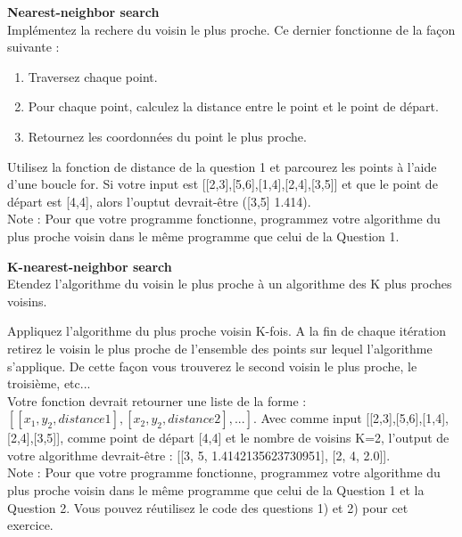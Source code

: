 \begin{Exercice}[10 minutes]\textbf{Nearest-neighbor search}\\

Implémentez la rechere du voisin le plus proche. Ce dernier fonctionne de la façon suivante :
\begin{enumerate}
    \item Traversez chaque point.
    \item Pour chaque point, calculez la distance entre le point et le point de départ.
    \item Retournez les coordonnées du point le plus proche.
\end{enumerate}
    
\begin{conseil}
    Utilisez la fonction de distance de la question 1 et parcourez les points à l'aide d'une boucle for. Si votre input est [[2,3],[5,6],[1,4],[2,4],[3,5]] et que le point de départ est [4,4], alors l'ouptut devrait-être ([3,5] 1.414).\\
    
    Note : Pour que votre programme fonctionne, programmez votre algorithme du plus proche voisin dans le même programme que celui de la Question 1.
\end{conseil}
\begin{solution}
    
\end{solution}
\end{Exercice}

\begin{Exercice}[15 minutes]\textbf{K-nearest-neighbor search}\\

Etendez l'algorithme du voisin le plus proche à un algorithme des K plus proches voisins.\\

\begin{conseil}
Appliquez l'algorithme du plus proche voisin K-fois. A la fin de chaque itération retirez le voisin le plus proche de l'ensemble des points sur lequel l'algorithme s'applique. De cette façon vous trouverez le second voisin le plus proche, le troisième, etc...\\

Votre fonction devrait retourner une liste de la forme : $[[x_1,y_2, distance1],[x_2,y_2,distance2],...]$. Avec comme input [[2,3],[5,6],[1,4],[2,4],[3,5]], comme point de départ [4,4] et le nombre de voisins K=2, l'output de votre algorithme devrait-être : [[3, 5, 1.4142135623730951], [2, 4, 2.0]].\\

Note : Pour que votre programme fonctionne, programmez votre algorithme du plus proche voisin dans le même programme que celui de la Question 1 et la Question 2. Vous pouvez réutilisez le code des questions 1) et 2) pour cet exercice.
\end{conseil}

\begin{solution}
    
\end{solution}
\end{Exercice}
\newpage
